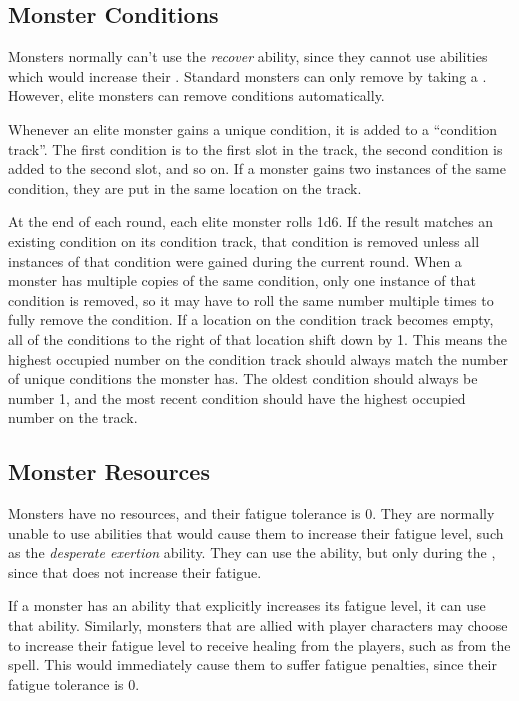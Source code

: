   \subsection{Monster Conditions}\label{Monster Conditions}
    Monsters normally can't use the \textit{recover} ability, since they cannot use abilities which would increase their .
    Standard monsters can only remove  by taking a .
    However, elite monsters can remove conditions automatically.

    Whenever an elite monster gains a unique condition, it is added to a ``condition track''.
    The first condition is to the first slot in the track, the second condition is added to the second slot, and so on.
    If a monster gains two instances of the same condition, they are put in the same location on the track.

    At the end of each round, each elite monster rolls 1d6.
    If the result matches an existing condition on its condition track, that condition is removed unless all instances of that condition were gained during the current round.
    When a monster has multiple copies of the same condition, only one instance of that condition is removed, so it may have to roll the same number multiple times to fully remove the condition.
    If a location on the condition track becomes empty, all of the conditions to the right of that location shift down by 1.
    This means the highest occupied number on the condition track should always match the number of unique conditions the monster has.
    The oldest condition should always be number 1, and the most recent condition should have the highest occupied number on the track.

  \subsection{Monster Resources}
    Monsters have no resources, and their fatigue tolerance is 0.
    They are normally unable to use abilities that would cause them to increase their fatigue level, such as the \textit{desperate exertion} ability.
    They can use the  ability, but only during the , since that does not increase their fatigue.

    If a monster has an ability that explicitly increases its fatigue level, it can use that ability.
    Similarly, monsters that are allied with player characters may choose to increase their fatigue level to receive healing from the players, such as from the  spell.
    This would immediately cause them to suffer fatigue penalties, since their fatigue tolerance is 0.

